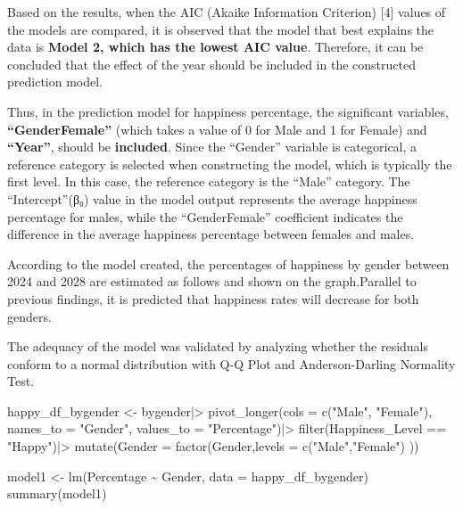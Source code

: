 \documentclass[
  11pt,
  a4paper,
  DIV=11,
  numbers=noendperiod]{scrartcl}
\newenvironment{Shaded}{\begin{snugshade}}{\end{snugshade}}
\newcommand{\AttributeTok}[1]{\textcolor[rgb]{0.40,0.45,0.13}{#1}}
\newcommand{\FunctionTok}[1]{\textcolor[rgb]{0.28,0.35,0.67}{#1}}
\newcommand{\NormalTok}[1]{\textcolor[rgb]{0.00,0.23,0.31}{#1}}
\newcommand{\OtherTok}[1]{\textcolor[rgb]{0.00,0.23,0.31}{#1}}
\newcommand{\SpecialCharTok}[1]{\textcolor[rgb]{0.37,0.37,0.37}{#1}}
\newcommand{\StringTok}[1]{\textcolor[rgb]{0.13,0.47,0.30}{#1}}
\begin{document}
Based on the results, when the AIC (Akaike Information Criterion)
{[}4{]} values of the models are compared, it is observed that the model
that best explains the data is {\textbf{Model 2, which has the lowest
AIC value}}. Therefore, it can be concluded that the effect of the year
should be included in the constructed prediction model.

Thus, in the prediction model for happiness percentage, the significant
variables, {\textbf{``GenderFemale''}} (which takes a value of 0 for
Male and 1 for Female) and {\textbf{``Year''}}, should be
{\textbf{included}}. Since the ``Gender'' variable is categorical, a
reference category is selected when constructing the model, which is
typically the first level. In this case, the reference category is the
``Male'' category. The ``Intercept''(β₀) value in the model output
represents the average happiness percentage for males, while the
``GenderFemale'' coefficient indicates the difference in the average
happiness percentage between females and males.

According to the model created, the percentages of happiness by gender
between 2024 and 2028 are estimated as follows and shown on the
graph.Parallel to previous findings, it is predicted that happiness
rates will decrease for both genders.

The adequacy of the model was validated by analyzing whether the
residuals conform to a normal distribution with Q-Q Plot and
Anderson-Darling Normality Test.

\begin{Shaded}
\begin{Highlighting}[]
\NormalTok{happy\_df\_bygender  }\OtherTok{\textless{}{-}}\NormalTok{ bygender}\SpecialCharTok{|\textgreater{}}
  \FunctionTok{pivot\_longer}\NormalTok{(}\AttributeTok{cols =} \FunctionTok{c}\NormalTok{(}\StringTok{"Male"}\NormalTok{, }\StringTok{"Female"}\NormalTok{), }
               \AttributeTok{names\_to =} \StringTok{"Gender"}\NormalTok{, }
               \AttributeTok{values\_to =} \StringTok{"Percentage"}\NormalTok{)}\SpecialCharTok{|\textgreater{}}
  \FunctionTok{filter}\NormalTok{(Happiness\_Level }\SpecialCharTok{==} \StringTok{"Happy"}\NormalTok{)}\SpecialCharTok{|\textgreater{}}
\FunctionTok{mutate}\NormalTok{(}\AttributeTok{Gender =} \FunctionTok{factor}\NormalTok{(Gender,}\AttributeTok{levels =} \FunctionTok{c}\NormalTok{(}\StringTok{"Male"}\NormalTok{,}\StringTok{"Female"}\NormalTok{)}
\NormalTok{))}

\NormalTok{model1 }\OtherTok{\textless{}{-}} \FunctionTok{lm}\NormalTok{(Percentage }\SpecialCharTok{\textasciitilde{}}\NormalTok{ Gender, }\AttributeTok{data =}\NormalTok{ happy\_df\_bygender)}
\FunctionTok{summary}\NormalTok{(model1)}
\end{Highlighting}
\end{Shaded}
\end{document}
